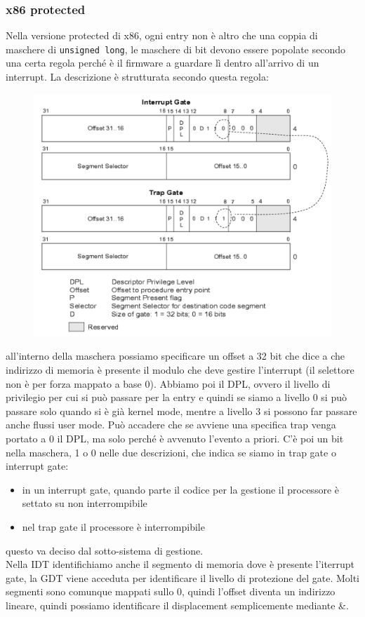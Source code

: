 \documentclass[12pt, oneside]{extbook}
\begin{document}
\subsubsection{x86 protected}
Nella versione protected di x86, ogni entry non è altro che una coppia di maschere di \texttt{unsigned long}, le maschere di bit devono essere popolate secondo una certa regola perché è il firmware a guardare lì dentro all'arrivo di un interrupt. La descrizione è strutturata secondo questa regola:
\begin{figure}[!h]
	\includegraphics[scale=0.2]{immagini/x86_protected_idt_entry.png}
\end{figure}
all'interno della maschera possiamo specificare un offset a 32 bit che dice a che indirizzo di memoria è presente il modulo che deve gestire l'interrupt (il selettore non è per forza mappato a base 0). Abbiamo poi il DPL, ovvero il livello di privilegio per cui si può passare per la entry e quindi se siamo a livello 0 si può passare solo quando si è già kernel mode, mentre a livello 3 si possono far passare anche flussi user mode. Può accadere che se avviene una specifica trap venga portato a 0 il DPL, ma solo perché è avvenuto l'evento a priori. C'è poi un bit nella maschera, 1 o 0 nelle due descrizioni, che indica se siamo in trap gate o interrupt gate:
\begin{itemize}
\item in un interrupt gate, quando parte il codice per la gestione il processore è settato su non interrompibile
\item nel trap gate il processore è interrompibile
\end{itemize}
questo va deciso dal sotto-sistema di gestione.\\
Nella IDT identifichiamo anche il segmento di memoria dove è presente l'iterrupt gate, la GDT viene acceduta per identificare il livello di protezione del gate. Molti segmenti sono comunque mappati sullo 0, quindi l'offset diventa un indirizzo lineare, quindi possiamo identificare il displacement semplicemente mediante \&.
\end{document}
